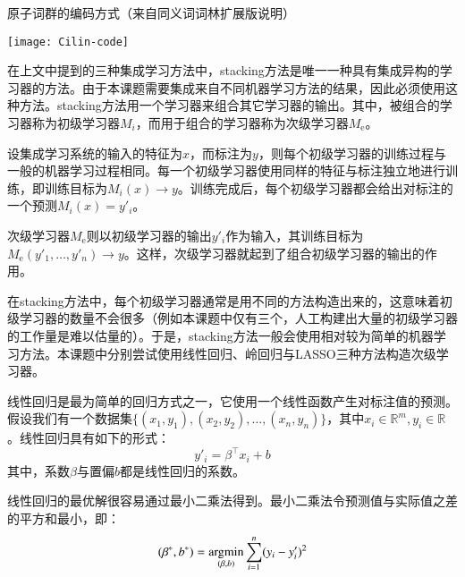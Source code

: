 \begin{table}[h]
	\caption{原子词群的编码方式（来自同义词词林扩展版说明）}
	\label{t:cilin code}
	\vspace{0.5em}
	\centering
	\texttt{[image: Cilin-code]}
\end{table}

在上文中提到的三种集成学习方法中，stacking方法是唯一一种具有集成异构的学习器的方法。由于本课题需要集成来自不同机器学习方法的结果，因此必须使用这种方法。stacking方法用一个学习器来组合其它学习器的输出。其中，被组合的学习器称为初级学习器$M_i$，而用于组合的学习器称为次级学习器$M_\text{e}$。

设集成学习系统的输入的特征为$x$，而标注为$y$，则每个初级学习器的训练过程与一般的机器学习过程相同。每一个初级学习器使用同样的特征与标注独立地进行训练，即训练目标为$M_i(x) \rightarrow y$。训练完成后，每个初级学习器都会给出对标注的一个预测$M_i(x) = y'_i$。

次级学习器$M_\text{e}$则以初级学习器的输出$y'_i$作为输入，其训练目标为$M_\text{e}(y'_1, \dots, y'_n) \rightarrow y$。这样，次级学习器就起到了组合初级学习器的输出的作用。

在stacking方法中，每个初级学习器通常是用不同的方法构造出来的，这意味着初级学习器的数量不会很多（例如本课题中仅有三个，人工构建出大量的初级学习器的工作量是难以估量的）。于是，stacking方法一般会使用相对较为简单的机器学习方法。本课题中分别尝试使用线性回归、岭回归与LASSO三种方法构造次级学习器。

线性回归是最为简单的回归方式之一，它使用一个线性函数产生对标注值的预测。假设我们有一个数据集$\bigl\{(x_1, y_1), (x_2, y_2), \dots, (x_n, y_n)\bigr\}$，其中$x_i \in \mathbb{R}^m, y_i \in \mathbb{R}$。线性回归具有如下的形式：
\begin{equation}
y'_i = \beta^\intercal x_i + b
\label{e:linear regression}
\end{equation}
其中，系数$\beta$与置偏$b$都是线性回归的系数。

线性回归的最优解很容易通过最小二乘法得到。最小二乘法令预测值与实际值之差的平方和最小，即：
\begin{equation}
(\beta^*, b^*) = \operatorname*{argmin}_{(\beta, b)} \sum_{i = 1}^{n} (y_i - y'_i)^2
\end{equation}

